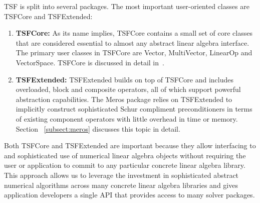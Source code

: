 \documentclass[12pt,relax]{TPA}
\begin{document}
TSF is split into several packages.  The most important user-oriented
classes are TSFCore and TSFExtended:
\begin{enumerate}
\item {\bf TSFCore:} As its name implies, TSFCore contains a small set
of core classes that are considered essential to almost any abstract
linear algebra interface.  The primary user classes in TSFCore are
Vector, MultiVector, LinearOp and VectorSpace. TSFCore is discussed in
detail in~\cite{TSFCore}.
\item {\bf TSFExtended:} TSFExtended builds on top of TSFCore and
includes overloaded, block and composite operators, all of
which support powerful abstraction capabilities.  The Meros package
relies on TSFExtended to implicitly construct sophisticated
Schur compliment preconditioners in terms of existing component
operators with little overhead in time or memory.  Section
~\ref{subsect:meros} discusses this topic in detail.
\end{enumerate}

Both TSFCore and TSFExtended are important because they allow
interfacing to and sophisticated use of numerical linear algebra objects
without requiring the user or application to commit to any particular
concrete linear algebra library.  This approach allows us to leverage
the investment in sophisticated abstract numerical algorithms across
many concrete linear algebra libraries and gives application
developers a single API that provides access to many solver packages.


%
%
%
%
\end{document}
